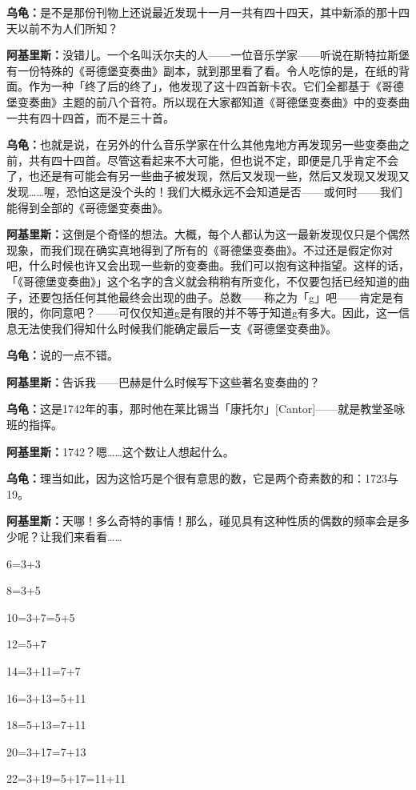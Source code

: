 \documentclass[
  12pt,
  twoside,
  openright,
  oldfontcommands,
]{memoir}
\newcommand{\dialogname}[1]{{\heifamily\bfseries #1}}
\begin{document}
\dialogname{乌龟：}是不是那份刊物上还说最近发现十一月一共有四十四天，其中新添的那十四天以前不为人们所知？

\dialogname{阿基里斯：}没错儿。一个名叫沃尔夫的人------一位音乐学家------听说在斯特拉斯堡有一份特殊的《哥德堡变奏曲》副本，就到那里看了看。令人吃惊的是，在纸的背面。作为一种「终了后的终了」，他发现了这十四首新卡农。它们全都基于《哥德堡变奏曲》主题的前八个音符。所以现在大家都知道《哥德堡变奏曲》中的变奏曲一共有四十四首，而不是三十首。

\dialogname{乌龟：}也就是说，在另外的什么音乐学家在什么其他鬼地方再发现另一些变奏曲之前，共有四十四首。尽管这看起来不大可能，但也说不定，即便是几乎肯定不会了，也还是有可能会有另一些曲子被发现，然后又发现一些，然后又发现又发现又发现\ldots\ldots 喔，恐怕这是没个头的！我们大概永远不会知道是否------或何时------我们能得到全部的《哥德堡变奏曲》。

\dialogname{阿基里斯：}这倒是个奇怪的想法。大概，每个人都认为这一最新发现仅只是个偶然现象，而我们现在确实真地得到了所有的《哥德堡变奏曲》。不过还是假定你对吧，什么时候也许又会出现一些新的变奏曲。我们可以抱有这种指望。这样的话，「《哥德堡变奏曲》」这个名字的含义就会稍稍有所变化，不仅要包括已经知道的曲子，还要包括任何其他最终会出现的曲子。总数------称之为「g」吧------肯定是有限的，你同意吧？------可仅仅知道g是有限的并不等于知道g有多大。因此，这一信息无法使我们得知什么时候我们能确定最后一支《哥德堡变奏曲》。

\dialogname{乌龟：}说的一点不错。

\dialogname{阿基里斯：}告诉我------巴赫是什么时候写下这些著名变奏曲的？

\dialogname{乌龟：}这是1742年的事，那时他在莱比锡当「康托尔」{[}Cantor{]}------就是教堂圣咏班的指挥。

\dialogname{阿基里斯：}1742？嗯\ldots\ldots 这个数让人想起什么。

\dialogname{乌龟：}理当如此，因为这恰巧是个很有意思的数，它是两个奇素数的和：1723与19。

\dialogname{阿基里斯：}天哪！多么奇特的事情！那么，碰见具有这种性质的偶数的频率会是多少呢？让我们来看看\ldots\ldots{}

6=3+3

8=3+5

10=3+7=5+5

12=5+7

14=3+11=7+7

16=3+13=5+11

18=5+13=7+11

20=3+17=7+13

22=3+19=5+17=11+11
\end{document}
